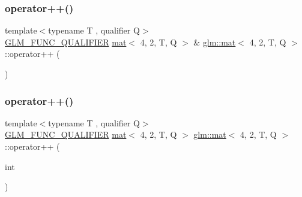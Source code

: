 \mbox{\label{structglm_1_1mat_3_014_00_012_00_01_t_00_01_q_01_4_a973f220e1471a6dd869ce2b5eb569bfa}} 
\subsubsection{\texorpdfstring{operator++()}{operator++()}\hspace{0.1cm}{\footnotesize\ttfamily [1/2]}}
{\footnotesize\ttfamily template$<$typename T , qualifier Q$>$ \\
\hyperlink{setup_8hpp_a33fdea6f91c5f834105f7415e2a64407}{G\+L\+M\+\_\+\+F\+U\+N\+C\+\_\+\+Q\+U\+A\+L\+I\+F\+I\+ER} \hyperlink{structglm_1_1mat}{mat}$<$ 4, 2, T, Q $>$ \& \hyperlink{structglm_1_1mat}{glm\+::mat}$<$ 4, 2, T, Q $>$\+::operator++ (\begin{DoxyParamCaption}{ }\end{DoxyParamCaption})}

\mbox{\label{structglm_1_1mat_3_014_00_012_00_01_t_00_01_q_01_4_ae81f2be5be6e25c0b903442b0ec65d9c}} 
\subsubsection{\texorpdfstring{operator++()}{operator++()}\hspace{0.1cm}{\footnotesize\ttfamily [2/2]}}
{\footnotesize\ttfamily template$<$typename T , qualifier Q$>$ \\
\hyperlink{setup_8hpp_a33fdea6f91c5f834105f7415e2a64407}{G\+L\+M\+\_\+\+F\+U\+N\+C\+\_\+\+Q\+U\+A\+L\+I\+F\+I\+ER} \hyperlink{structglm_1_1mat}{mat}$<$ 4, 2, T, Q $>$ \hyperlink{structglm_1_1mat}{glm\+::mat}$<$ 4, 2, T, Q $>$\+::operator++ (\begin{DoxyParamCaption}\item[{int}]{ }\end{DoxyParamCaption})}

\mbox{\label{structglm_1_1mat_3_014_00_012_00_01_t_00_01_q_01_4_ada841f0d997158c603b39e19bea7686c}} 
